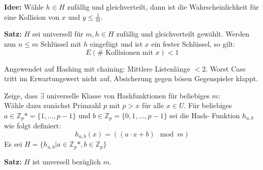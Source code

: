 \documentclass[fleqn]{scrartcl}
\begin{document}
\textbf{Idee:} Wähle $h \in H$ zufällig und gleichverteilt, dann ist die Wahrscheinlichkeit für eine Kollision von $x$ und $y \leq \frac{1}{m}$.

\textbf{Satz:} $H$ sei universell für $m, h \in H$ zufällig und gleichverteilt gewählt. Werden nun $n \leq m$ Schlüssel mit $h$ eingefügt und ist $x$ ein fester Schlüssel, so gilt: \[E (\# \text{ Kollisionen mit }x) < 1\]

Angewendet auf Hashing mit chaining: Mittlere Listenlänge $ < 2$. Worst Case tritt im Erwartungswert nicht auf, Absicherung gegen bösen Gegenspieler klappt.

Zeige, dass $\exists$ universelle Klasse von Hashfunktionen für beliebiges $m$:\\

Wähle dazu zunächst Primzahl $p$ mit $p > x$ für alle $x \in U$.
Für beliebiges $a \in \mathbb{Z}_p* = \{1, ..., p-1\}$ und $b \in \mathbb{Z}_p = \{0, 1, ..., p-1\}$ sei die Hash- Funktion $h_{a,b}$ wie folgt definiert:
\[h_{a,b}(x) = ((a\cdot x + b) \mod{m})\]
Es sei $H = \{h_{a,b} | a \in \mathbb{Z}_p*, b \in \mathbb{Z}_p\}$

\textbf{Satz:} $H$ ist unversell bezüglich $m$.
\end{document}
